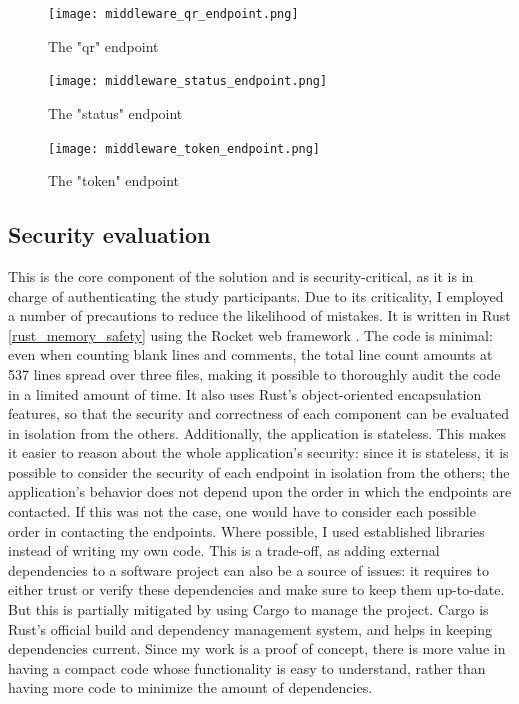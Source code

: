 \documentclass{report}
\begin{document}
\begin{figure}[H]
		\texttt{[image: middleware\_qr\_endpoint.png]}
		\vspace{-10pt}
		\caption{The "qr" endpoint}
		\vspace{10pt}

		\texttt{[image: middleware\_status\_endpoint.png]}
		\vspace{-10pt}
		\caption{The "status" endpoint}
		\vspace{10pt}

		\texttt{[image: middleware\_token\_endpoint.png]}
		\vspace{-10pt}
		\caption{The "token" endpoint}
\end{figure}


\subsection{Security evaluation}
This is the core component of the solution and is security-critical, as it is in charge of authenticating the study participants.  Due to its criticality, I employed a number of
precautions to reduce the likelihood of mistakes. It is written in Rust \ref{rust_memory_safety} using the Rocket web framework \cite{rocket}.  The code is minimal: even when
counting blank lines and comments, the total line count amounts at 537 lines spread over three files, making it possible to thoroughly audit the code in a limited amount of time. It
also uses Rust's object-oriented encapsulation features, so that the security and correctness of each component can be evaluated in isolation from the others. Additionally, the
application is stateless. This makes it easier to reason about the whole application's security: since it is stateless, it is possible to consider the security of each endpoint in
isolation from the others; the application's behavior does not depend upon the order in which the endpoints are contacted. If this was not the case, one would have to consider each
possible order in contacting the endpoints. Where possible, I used established libraries instead of writing my own code. This is a trade-off, as adding external dependencies to a
software project can also be a source of issues: it requires to either trust or verify these dependencies and make sure to keep them up-to-date. But this is partially mitigated by
using Cargo \cite{cargo} to manage the project. Cargo is Rust's official build and dependency management system, and helps in keeping dependencies current. Since my work is a proof of concept,
there is more value in having a compact code whose functionality is easy to understand, rather than having more code to minimize the amount of dependencies.\par
\end{document}
